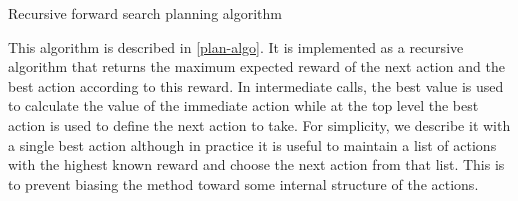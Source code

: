 \begin{algorithm}[ht]
\SetAlgoLined
\DontPrintSemicolon
{}
 
 \caption{Recursive forward search planning algorithm}
 \label{plan-algo}
\end{algorithm}



This algorithm is described in \autoref{plan-algo}.
It is implemented as a recursive algorithm that returns the maximum expected reward of the next action and the best action according to this reward.
In intermediate calls, the best value is used to calculate the value of the immediate action while at the top level the best action is used to define the next action to take.
For simplicity, we describe it with a single best action although in practice it is useful to maintain a list of actions with the highest known reward and choose the next action from that list. This is to prevent biasing the method toward some internal structure of the actions.

